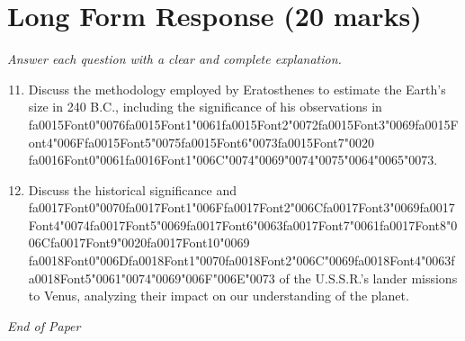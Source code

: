 \documentclass[12pt]{article}
\begin{document}
\begin{enumerate}[label=\arabic*.]
\end{enumerate}

\section*{Long Form Response (20 marks)}
\textit{Answer each question with a clear and complete explanation.}
\begin{enumerate}[label=\arabic*.]
\setcounter{enumi}{10}
\item Discuss the methodology employed by Eratosthenes to estimate the Earth's size in 240 B.C.,
including the significance of his observations in {\csname fa0015Font0\endcsname\char"0076}{\csname fa0015Font1\endcsname\char"0061}{\csname fa0015Font2\endcsname\char"0072}{\csname fa0015Font3\endcsname\char"0069}{\csname fa0015Font4\endcsname\char"006F}{\csname fa0015Font5\endcsname\char"0075}{\csname fa0015Font6\endcsname\char"0073}{\csname fa0015Font7\endcsname\char"0020} {\csname fa0016Font0\endcsname\char"0061}{\csname fa0016Font1\endcsname\char"006C}{\char"0074}{\char"0069}{\char"0074}{\char"0075}{\char"0064}{\char"0065}{\char"0073}.
\item Discuss the historical significance and {\csname fa0017Font0\endcsname\char"0070}{\csname fa0017Font1\endcsname\char"006F}{\csname fa0017Font2\endcsname\char"006C}{\csname fa0017Font3\endcsname\char"0069}{\csname fa0017Font4\endcsname\char"0074}{\csname fa0017Font5\endcsname\char"0069}{\csname fa0017Font6\endcsname\char"0063}{\csname fa0017Font7\endcsname\char"0061}{\csname fa0017Font8\endcsname\char"006C}{\csname fa0017Font9\endcsname\char"0020}{\csname fa0017Font10\endcsname\char"0069} {\csname fa0018Font0\endcsname\char"006D}{\csname fa0018Font1\endcsname\char"0070}{\csname fa0018Font2\endcsname\char"006C}{\char"0069}{\csname fa0018Font4\endcsname\char"0063}{\csname fa0018Font5\endcsname\char"0061}{\char"0074}{\char"0069}{\char"006F}{\char"006E}{\char"0073} of the U.S.S.R.'s lander
missions to Venus, analyzing their impact on our understanding of the planet.
\end{enumerate}

\vfill
\noindent\textit{End of Paper}
\end{document}
